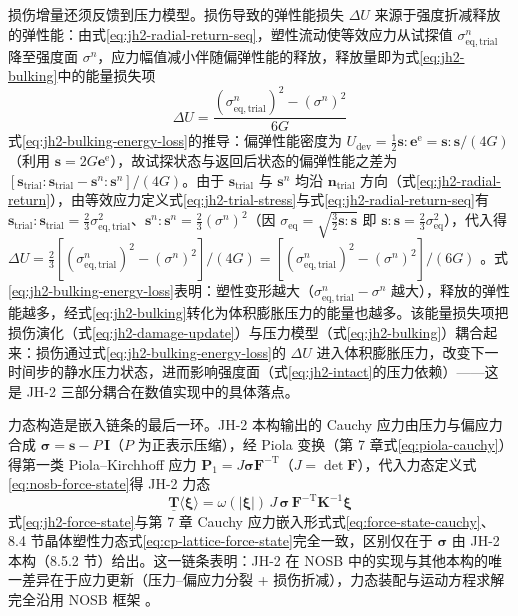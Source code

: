 损伤增量还须反馈到压力模型。损伤导致的弹性能损失 $\Delta U$ 来源于强度折减释放的弹性能：由式\eqref{eq:jh2-radial-return-seq}，塑性流动使等效应力从试探值 $\sigma^{n}_{\mathrm{eq,trial}}$ 降至强度面 $\sigma^{n}$，应力幅值减小伴随偏弹性能的释放，释放量即为式\eqref{eq:jh2-bulking}中的能量损失项
\begin{equation}
  \Delta U
  =\frac{(\sigma^{n}_{\mathrm{eq,trial}})^{2}-(\sigma^{n})^{2}}{6G}
  \label{eq:jh2-bulking-energy-loss}
\end{equation}
式\eqref{eq:jh2-bulking-energy-loss}的推导：偏弹性能密度为 $U_{\mathrm{dev}}=\tfrac{1}{2}\mathbf{s}:\mathbf{e}^{\mathrm{e}}=\mathbf{s}:\mathbf{s}/(4G)$（利用 $\mathbf{s}=2G\mathbf{e}^{\mathrm{e}}$），故试探状态与返回后状态的偏弹性能之差为 $[\mathbf{s}_{\mathrm{trial}}:\mathbf{s}_{\mathrm{trial}}-\mathbf{s}^{n}:\mathbf{s}^{n}]/(4G)$。由于 $\mathbf{s}_{\mathrm{trial}}$ 与 $\mathbf{s}^{n}$ 均沿 $\mathbf{n}_{\mathrm{trial}}$ 方向（式\eqref{eq:jh2-radial-return}），由等效应力定义式\eqref{eq:jh2-trial-stress}与式\eqref{eq:jh2-radial-return-seq}有 $\mathbf{s}_{\mathrm{trial}}:\mathbf{s}_{\mathrm{trial}}=\tfrac{2}{3}\sigma^{2}_{\mathrm{eq,trial}}$、$\mathbf{s}^{n}:\mathbf{s}^{n}=\tfrac{2}{3}(\sigma^{n})^{2}$（因 $\sigma_{\mathrm{eq}}=\sqrt{\tfrac{3}{2}\mathbf{s}:\mathbf{s}}$ 即 $\mathbf{s}:\mathbf{s}=\tfrac{2}{3}\sigma_{\mathrm{eq}}^{2}$），代入得 $\Delta U=\tfrac{2}{3}[(\sigma^{n}_{\mathrm{eq,trial}})^{2}-(\sigma^{n})^{2}]/(4G)=[(\sigma^{n}_{\mathrm{eq,trial}})^{2}-(\sigma^{n})^{2}]/(6G)$ \cite{JohnsonHolmquist1994,JohnsonHolmquist1999}。式\eqref{eq:jh2-bulking-energy-loss}表明：塑性变形越大（$\sigma^{n}_{\mathrm{eq,trial}}-\sigma^{n}$ 越大），释放的弹性能越多，经式\eqref{eq:jh2-bulking}转化为体积膨胀压力的能量也越多。该能量损失项把损伤演化（式\eqref{eq:jh2-damage-update}）与压力模型（式\eqref{eq:jh2-bulking}）耦合起来：损伤通过式\eqref{eq:jh2-bulking-energy-loss}的 $\Delta U$ 进入体积膨胀压力，改变下一时间步的静水压力状态，进而影响强度面（式\eqref{eq:jh2-intact}的压力依赖）——这是 JH-2 三部分耦合在数值实现中的具体落点。

力态构造是嵌入链条的最后一环。JH-2 本构输出的 Cauchy 应力由压力与偏应力合成 $\boldsymbol{\sigma}=\mathbf{s}-P\,\mathbf{I}$（$P$ 为正表示压缩），经 Piola 变换（第 7 章式\eqref{eq:piola-cauchy}）得第一类 Piola--Kirchhoff 应力 $\mathbf{P}_{1}=J\boldsymbol{\sigma}\mathbf{F}^{-\mathrm{T}}$（$J=\det\mathbf{F}$），代入力态定义式\eqref{eq:nosb-force-state}得 JH-2 力态
\begin{equation}
  \underline{\mathbf{T}}\langle\boldsymbol{\xi}\rangle
  =\omega(|\boldsymbol{\xi}|)\,J\,\boldsymbol{\sigma}\,\mathbf{F}^{-\mathrm{T}}\mathbf{K}^{-1}\boldsymbol{\xi}
  \label{eq:jh2-force-state}
\end{equation}
式\eqref{eq:jh2-force-state}与第 7 章 Cauchy 应力嵌入形式式\eqref{eq:force-state-cauchy}、8.4 节晶体塑性力态式\eqref{eq:cp-lattice-force-state}完全一致，区别仅在于 $\boldsymbol{\sigma}$ 由 JH-2 本构（8.5.2 节）给出。这一链条表明：JH-2 在 NOSB 中的实现与其他本构的唯一差异在于应力更新（压力--偏应力分裂 + 损伤折减），力态装配与运动方程求解完全沿用 NOSB 框架 \cite{Lai2018,ZhuZhao2021}。

